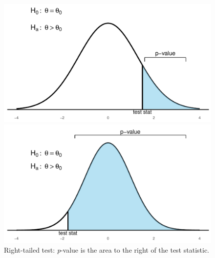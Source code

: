 \begin{figure}[H]
  \centering
  \begin{minipage}[t]{0.48\textwidth}
    \centering
    \includegraphics[width=\linewidth]{section11/images/hypothesis_right_tail.pdf}
  \end{minipage}
  \hfill
  \begin{minipage}[t]{0.48\textwidth}
    \centering
    \includegraphics[width=\linewidth]{section11/images/hypothesis_right_tail_wide.pdf}
  \end{minipage}
  \caption{Right-tailed test: \textit{p}-value is the area to the right of the test statistic.}
\end{figure}


